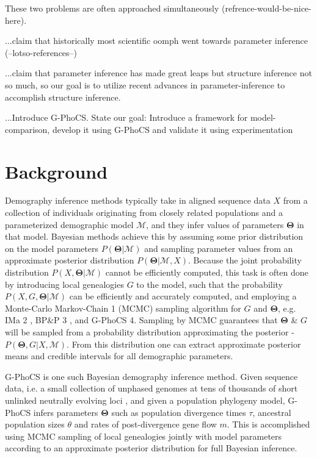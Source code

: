 \documentclass[11pt]{article}
\newcommand{\vect}[1]{\boldsymbol{\mathbf{#1}}}
\newcommand{\M}{\mathcal{M}}
\newcommand{\T}{\vect{\Theta}}
\newcommand{\1}{\mathbbm{1}}
\newcommand{\gp}{G-PhoCS }
\begin{document}
These two problems are often approached simultaneously (refrence-would-be-nice-here).

...claim that historically most scientific oomph went towards parameter inference (--lotso-references--)

...claim that parameter inference has made great leaps but structure inference not so much, so our goal is to utilize recent advances in parameter-inference to accomplish structure inference. 

...Introduce G-PhoCS. State our goal: Introduce a framework for model-comparison, develop it using G-PhoCS and validate it using experimentation


\section{Background}


Demography inference methods typically take in aligned sequence data $X$ from a collection of individuals originating from closely related populations and a parameterized demographic model $\M$, and they infer
values of parameters $\T$ in that model. Bayesian methods achieve this by assuming some prior distribution on the model parameters $P(\T|\M)$ and sampling parameter values from an approximate posterior distribution $P(\T|\M, X)$. Because the joint probability distribution $P(X, \T|\M)$ cannot be efficiently computed, this task is often done by introducing local genealogies $G$ to the model, such that the probability $P(X , G, \T|\M)$ can be efficiently and accurately computed, and employing a Monte-Carlo Markov-Chain 1 (MCMC) sampling algorithm for $G$ and $\T$, e.g. IMa 2 , BP\&P 3 , and \gp 4. 
%
Sampling by MCMC guarantees that $\T$ \& $G$ will be sampled from a probability distribution approximating the posterior - $P(\T, G|X , \M)$. From this distribution one can extract approximate posterior means and credible intervals for all demographic parameters.

\gp is one such Bayesian demography inference method. Given sequence data, i.e. a small collection of unphased genomes at tens of thousands of short unlinked neutrally evolving loci , and given a population phylogeny model, \gp infers parameters $\T$ such as population divergence times $\tau$, ancestral population sizes $\theta$ and rates of post-divergence gene flow $m$. This is accomplished using MCMC sampling of local genealogies jointly with model parameters according to an approximate posterior distribution for full Bayesian inference.
\end{document}
